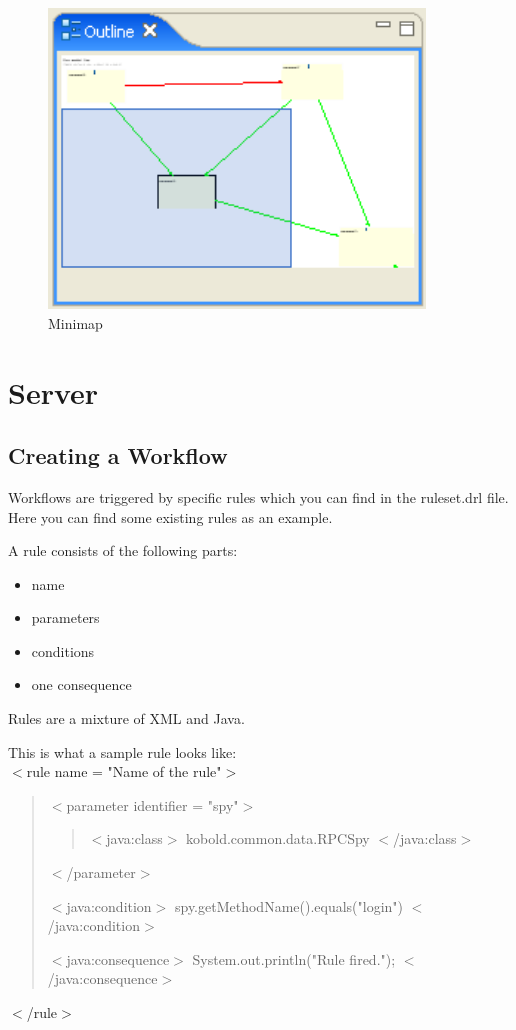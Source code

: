 \begin{figure}[h!]
\begin{center}
\includegraphics[width=10cm]{outline.png}
   \caption{Minimap}
\label{map}
\end{center}
\end{figure}\par




\section{Server}

\subsection{Creating a Workflow}

Workflows are triggered by specific rules which you can find in the ruleset.drl file.
Here you can find some existing rules as an example. \par

A rule consists of the following parts:
\begin{itemize}
	\item name
	\item parameters
	\item conditions
	\item one consequence
\end{itemize}
Rules are a mixture of XML and Java.\par

This is what a sample rule looks like: \\

$<$rule name = "Name of the rule"$>$\\
\begin{quote}
$<$parameter identifier = "spy"$>$\\
\begin{quote}
$<$java:class$>$ kobold.common.data.RPCSpy $<$/java:class$>$\\
\end{quote}
$<$/parameter$>$\par
$<$java:condition$>$ spy.getMethodName().equals("login") $<$/java:condition$>$\par
$<$java:consequence$>$ System.out.println("Rule fired."); $<$/java:consequence$>$\\
\end{quote}
$<$/rule$>$\par


